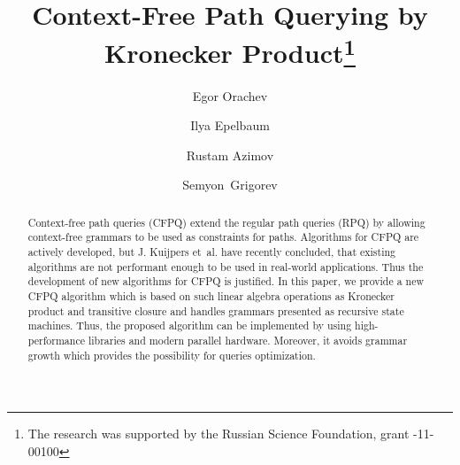 \documentclass[runningheads,table]{llncs}
\begin{document}
%
\title{Context-Free Path Querying by Kronecker Product\thanks{The research was supported by the Russian Science Foundation, grant -11-00100}}
%
%
\author{Egor Orachev \and
Ilya Epelbaum \and
Rustam Azimov \and
Semyon~Grigorev}
%
%
%
\maketitle              %
%
\begin{abstract}
Context-free path queries (CFPQ) extend the regular path queries (RPQ) by allowing context-free grammars to be used as constraints for paths.
Algorithms for CFPQ are actively developed, but J. Kuijpers et~al. have recently concluded, that existing algorithms are not performant enough to be used in real-world applications.
Thus the development of new algorithms for CFPQ is justified.
In this paper, we provide a new CFPQ algorithm which is based on such linear algebra operations as Kronecker product and transitive closure and handles grammars presented as recursive state machines.
Thus, the proposed algorithm can be implemented by using high-performance libraries and modern parallel hardware.
Moreover, it avoids grammar growth which provides the possibility for queries optimization.


\end{abstract}
%
%
%








%
%
%
 
 
\end{document}
